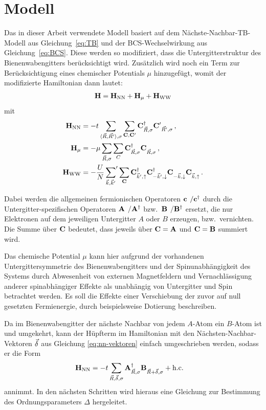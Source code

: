 \chapter{Modell}\label{sec:modell}

Das in dieser Arbeit verwendete Modell basiert auf dem Nächste-Nachbar-TB-Modell aus Gleichung~\eqref{eq:TB} und der BCS-Wechselwirkung aus Gleichung~\eqref{eq:BCS}. 
Diese werden so modifiziert, dass die Untergitterstruktur des Bienenwabengitters berücksichtigt wird.
Zusätzlich wird noch ein Term zur Berücksichtigung eines chemischer Potentials $\mu$ hinzugefügt, womit der modifizierte Hamiltonian dann lautet:
\begin{align}
    \mathbf{H} = \mathbf{H}_{\mathrm{NN}} + \mathbf{H}_{\mu} + \mathbf{H}_{\mathrm{WW}} 
\end{align}
mit 
\begin{align}
    \oHNN &= - t \sum_{\expval{\vec{R}, \vec{R'}}, \sigma} \sum_{\oC, \oC'}\ocd{\vec{R}, \sigma} \op{C'}^{\pdagg}_{\vec{R'}, \sigma}\, , \\
    \oH_{\mu} &= - \mu \sum_{\vec{R}, \sigma} \sum_C \op{C}^{\dagg}_{\vec{R}, \sigma} \op{C}^{\pdagg}_{\vec{R}, \sigma} \, ,\\
    \oHWW &=  - \frac{U}{N} \sump{\vk, \vk'} \sum_\oC  \ocdu \ocdd \ocndd \ocndu \, .
\end{align}

Dabei werden die allgemeinen fermionischen Operatoren $\ofe{}/\ofed{}$  durch die Untergitter-spezifischen Operatoren $\oa{}/\oad{}$ bzw.\ $\ob{}/\obd{}$ ersetzt, die nur Elektronen auf dem jeweiligen Untergitter $A$ oder $B$ erzeugen, bzw.~vernichten. 
Die Summe über $\mathbf{C}$ bedeutet, dass jeweils über $\mathbf{C} = \mathbf{A}$ und $\mathbf{C} = \mathbf{B}$ summiert wird. 

Das chemische Potential $\mu$ kann hier aufgrund der vorhandenen Untergittersymmetrie des Bienenwabengitters und der Spinunabhängigkeit des Systems durch Abwesenheit von externen Magnetfeldern und Vernachlässigung anderer spinabhängiger Effekte als unabhängig von Untergitter und Spin betrachtet werden. 
Es soll die Effekte einer Verschiebung der zuvor auf null gesetzten Fermienergie, durch beispielsweise Dotierung beschreiben.

Da im Bienenwabengitter der nächste Nachbar von jedem $A$-Atom ein $B$-Atom ist und umgekehrt, kann der Hüpfterm im Hamiltonian mit den Nächsten-Nachbar-Vektoren ${\vec{\delta}}$ aus Gleichung \eqref{eq:nn-vektoren} einfach umgeschrieben werden, sodass er die Form
\begin{align}
    \oHNN &= - t \sum_{\vec{R}, \vdelta, \sigma} \oad{\vec{R}, \sigma} \ob{\vec{R} + \vdelta, \sigma} + \hc 
\end{align}
annimmt. 
In den nächsten Schritten wird hieraus eine Gleichung zur Bestimmung des Ordnungsparameters $\Delta$ hergeleitet.




